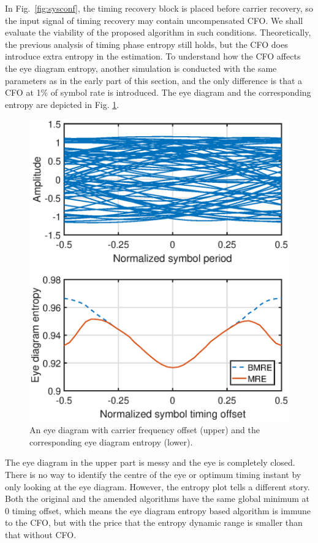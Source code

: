 \documentclass[journal,comsoc]{IEEEtran}
\begin{document}
In Fig.~\ref{fig:sysconf}, the timing recovery block is placed before carrier recovery, so the input signal of timing recovery may contain uncompensated CFO.
We shall evaluate the viability of the proposed algorithm in such conditions. 
Theoretically, the previous analysis of timing phase entropy still holds, but the CFO does introduce extra entropy in the estimation.
To understand how the CFO affects the eye diagram entropy, another simulation is conducted with the same parameters as in the early part of this section,
and the only difference is that a CFO at 1\% of symbol rate is introduced.
The eye diagram and the corresponding entropy are depicted in Fig. \ref{fig:timing_freq}.
      
\begin{figure}[ht]
\centering
\includegraphics[width=3 in]{pic/timing_freq.eps}
\caption{An eye diagram with carrier frequency offset (upper) and the corresponding eye diagram entropy (lower).}
\label{fig:timing_freq} 
\end{figure}

The eye diagram in the upper part is messy and the eye is completely closed. 
There is no way to identify the centre of the eye or optimum timing instant by only looking at the eye diagram.
However, the entropy plot tells a different story.
Both the original and the amended algorithms have the same global minimum at 0 timing offset, which means the eye diagram entropy based algorithm is immune to the CFO,
but with the price that the entropy dynamic range is smaller than that without CFO.
\end{document}
